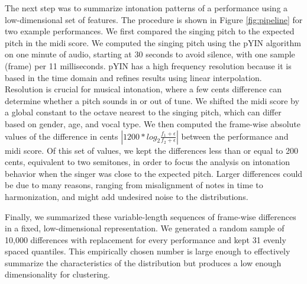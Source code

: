 The next step was to summarize intonation patterns of a performance using a low-dimensional set of features. The procedure is shown in Figure \ref{fig:pipeline} for two example performances. We first compared the singing pitch to the expected pitch in the \gls{midi} score. We computed the singing pitch using the pYIN algorithm \cite{mauch2014pyin} on one minute of audio, starting at 30 seconds to avoid silence, with one sample (frame) per 11 milliseconds. pYIN has a high frequency resolution because it is based in the time domain and refines results using linear interpolation. Resolution is crucial for musical intonation, where a few cents difference can determine whether a pitch sounds in or out of tune. We shifted the \gls{midi} score by a global constant to the octave nearest to the singing pitch, which can differ based on gender, age, and vocal type. We then computed the frame-wise absolute values of the difference in cents $\left| 1200 * log_2 \frac{f_1 + \epsilon} {f_2 + \epsilon} \right|$ between the performance and \gls{midi} score. Of this set of values, we kept the differences less than or equal to 200 cents, equivalent to two semitones, in order to focus the analysis on intonation behavior when the singer was close to the expected pitch. Larger differences could be due to many reasons, ranging from misalignment of notes in time to harmonization, and might add undesired noise to the distributions. 

Finally, we summarized these variable-length sequences of frame-wise differences in a fixed, low-dimensional representation. We generated a random sample of 10,000 differences with replacement for every performance and kept 31 evenly spaced quantiles. This empirically chosen number is large enough to effectively summarize the characteristics of the distribution but produces a low enough dimensionality for clustering.

